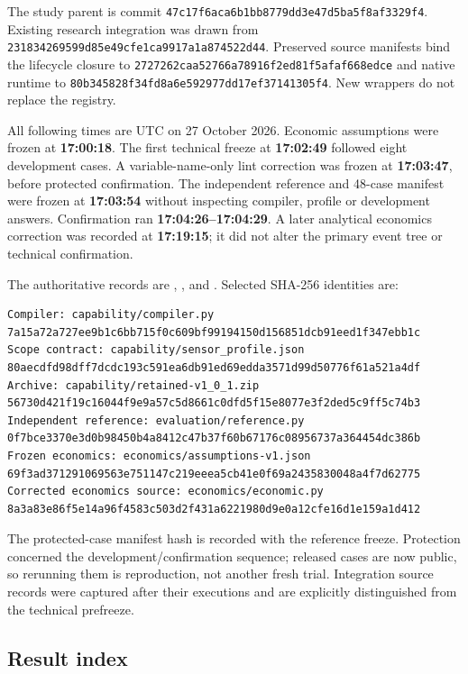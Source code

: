 \documentclass[11pt,letterpaper]{article}
\begin{document}
The study parent is commit
\texttt{47c17f6aca6b1bb8779dd3e47d5ba5f8af3329f4}. Existing research
integration was drawn from
\texttt{231834269599d85e49cfe1ca9917a1a874522d44}. Preserved source
manifests bind the lifecycle closure to
\texttt{2727262caa52766a78916f2ed81f5afaf668edce} and native runtime to
\texttt{80b345828f34fd8a6e592977dd17ef37141305f4}. New wrappers do not
replace the registry.

All following times are UTC on 27 October 2026. Economic assumptions
were frozen at \textbf{17:00:18}. The first technical freeze at
\textbf{17:02:49} followed eight development cases. A variable-name-only
lint correction was frozen at \textbf{17:03:47}, before protected
confirmation. The independent reference and 48-case manifest were frozen
at \textbf{17:03:54} without inspecting compiler, profile or development
answers. Confirmation ran \textbf{17:04:26--17:04:29}. A later
analytical economics correction was recorded at \textbf{17:19:15}; it
did not alter the primary event tree or technical confirmation.

The authoritative records are
,
,
 and
. Selected SHA-256
identities are:

\begin{verbatim}
Compiler: capability/compiler.py
7a15a72a727ee9b1c6bb715f0c609bf99194150d156851dcb91eed1f347ebb1c
Scope contract: capability/sensor_profile.json
80aecdfd98dff7dcdc193c591ea6db91ed69edda3571d99d50776f61a521a4df
Archive: capability/retained-v1_0_1.zip
56730d421f19c16044f9e9a57c5d8661c0dfd5f15e8077e3f2ded5c9ff5c74b3
Independent reference: evaluation/reference.py
0f7bce3370e3d0b98450b4a8412c47b37f60b67176c08956737a364454dc386b
Frozen economics: economics/assumptions-v1.json
69f3ad371291069563e751147c219eeea5cb41e0f69a2435830048a4f7d62775
Corrected economics source: economics/economic.py
8a3a83e86f5e14a96f4583c503d2f431a6221980d9e0a12cfe16d1e159a1d412
\end{verbatim}

The protected-case manifest hash is recorded with the reference freeze.
Protection concerned the development/confirmation sequence; released
cases are now public, so rerunning them is reproduction, not another
fresh trial. Integration source records were captured after their
executions and are explicitly distinguished from the technical
prefreeze.

\hypertarget{result-index}{%
\subsection{Result index}\label{result-index}}
\end{document}

